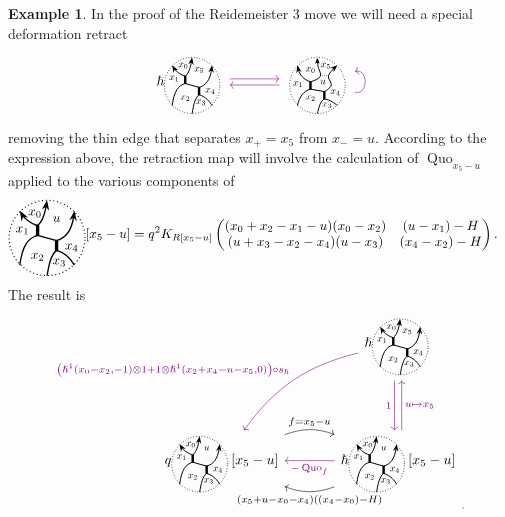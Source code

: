 \documentclass{article}
\DeclareMathOperator{\Quo}{Quo}
\theoremstyle{plain} %
\theoremstyle{definition} %
\newtheorem{example}[theorem]{Example}
\theoremstyle{remark} %
\begin{document}
\begin{example}
	In the proof of the Reidemeister 3 move we will need a special deformation retract
	\[
	\begin{tikzcd}[column sep=large, ampersand replacement=\&]
		{\hslash \scalebox{0.7}{\ThickLThickRStandard}} 
		\arrow[r, shift left=0.5ex, color=violet] 
		\arrow[r, leftarrow, shift right=0.5ex, swap, color=violet] 
		\& 
		{\scalebox{0.7}{\ThinRThickLThickRStandard{u}}} 
		\arrow[loop right, distance=1em, in=15, out=-15, ,swap, color=violet]
	\end{tikzcd}
	\]
	removing the thin edge that separates $x_+=x_5$ from $x_-=u$. According to the expression above, the retraction map will involve the calculation of $\Quo_{x_5-u}$ applied to the various components of
	\begin{align*}
		{\ThickLThickR{x_0}{x_1}{x_2}{x_3}{x_4}{u}} [x_5-u]
		& = q^2 K_{R[x_5-u]}
		\begin{pmatrix}
			(x_0+x_2-x_1-u)(x_0-x_2) 
			& 
			(u-x_1)-H
			\\
			(u+x_3-x_2-x_4)(u-x_3) 
			& 
			(x_4-x_2)-H
		\end{pmatrix}.
	\end{align*}
	The result is
	\[
	\begin{tikzcd}[column sep=large]
		&
		\hslash \scalebox{0.7}{\ThickLThickRStandard} 
		\ar[dd, shift right=0.6ex, "1", swap, color=violet]
		\ar[dd, leftarrow, shift left=0.6ex, "u\mapsto x_5", color=violet]
		\arrow[ddl, "{\left(\hslash^1(x_0-x_2,-1)\otimes 1+1\otimes\hslash^1(x_2+x_4-u-x_5,0)\right)\circ s_\hslash}", bend right=20, swap, color=violet]
		\\
		\\
		q \scalebox{0.7}{\ThickLThickR{x_0}{x_1}{x_2}{x_3}{x_4}{u}}[x_5-u]
		\arrow[r, "f=x_5-u", shift left=0.5ex, bend left=20]
		& 
		\hslash \scalebox{0.7}{\ThickLThickR{x_0}{x_1}{x_2}{x_3}{x_4}{u}}[x_5-u]
		\ar[l, "-\Quo_f", color=violet]
		\arrow[l, "(x_5+u-x_0-x_4)((x_4-x_0)-H)", shift left=0.5ex, bend left=20]
	\end{tikzcd}_.
	\]
\end{example}
\end{document}
